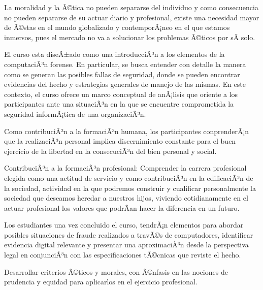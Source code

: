 \begin{syllabus}


\begin{justification}
La moralidad y la Ã©tica no pueden separarse del individuo y como consecuencia
no pueden separarse de su actuar diario y profesional, existe una necesidad 
mayor de Ã©stas en el mundo globalizado y contemporÃ¡neo en el que estamos inmersos, 
pues el mercado no va a solucionar los problemas Ã©ticos por sÃ­ solo.

El curso esta diseÃ±ado como una introducciÃ³n a los elementos de la computaciÃ³n forense. 
En particular, se busca entender con detalle la manera como se generan las posibles 
fallas de seguridad, donde se pueden encontrar evidencias del hecho y estrategias 
generales de manejo de las mismas. En este contexto, el curso ofrece un marco 
conceptual de anÃ¡lisis que oriente a los participantes ante una situaciÃ³n en la 
que se encuentre comprometida la seguridad informÃ¡tica de una organizaciÃ³n.

Como contribuciÃ³n a la formaciÃ³n humana, los participantes conprenderÃ¡n que la 
realizaciÃ³n personal implica discernimiento constante para el buen ejercicio 
de la libertad en la consecuciÃ³n del bien personal y social.

ContribuciÃ³n a la formaciÃ³n profesional: Comprender la carrera profesional 
elegida como una actitud de servicio y como contribuciÃ³n en la edificaciÃ³n 
de la sociedad, actividad en la que podremos construir y cualificar personalmente 
la sociedad que deseamos heredar a nuestros hijos, viviendo cotidianamente 
en el actuar profesional los valores que podrÃ­an hacer la diferencia en un futuro.

Los estudiantes una vez concluido el curso, tendrÃ¡n elementos para abordar 
posibles situaciones de fraude realizados a travÃ©s de computadores, 
identificar evidencia digital relevante y presentar una aproximaciÃ³n desde la 
perspectiva legal en conjunciÃ³n con las especificaciones tÃ©cnicas que reviste 
el hecho.
\end{justification}

\begin{goals}
\item Desarrollar criterios Ã©ticos y morales, con Ã©nfasis en las nociones de prudencia y equidad para aplicarlos en el ejercicio profesional.
\end{goals}


\end{syllabus}
